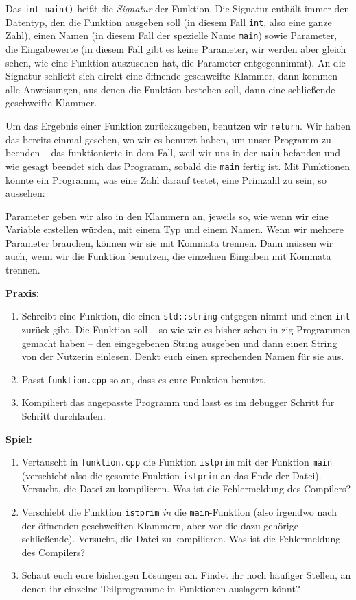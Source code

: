 Das \texttt{int main()} heißt die \emph{Signatur} der Funktion. Die Signatur
enthält immer den Datentyp, den die Funktion ausgeben soll (in diesem Fall
\texttt{int}, also eine ganze Zahl), einen Namen (in diesem Fall der spezielle
Name \texttt{main}) sowie Parameter, die Eingabewerte (in diesem Fall gibt es
keine Parameter, wir werden aber gleich sehen, wie eine Funktion auszusehen
hat, die Parameter entgegennimmt). An die Signatur schließt sich direkt eine
öffnende geschweifte Klammer, dann kommen alle Anweisungen, aus denen die
Funktion bestehen soll, dann eine schließende geschweifte Klammer.

Um das Ergebnis einer Funktion zurückzugeben, benutzen wir \texttt{return}. Wir
haben das bereits einmal gesehen, wo wir es benutzt haben, um unser Programm zu
beenden -- das funktionierte in dem Fall, weil wir uns in der \texttt{main}
befanden und wie gesagt beendet sich das Programm, sobald die \texttt{main}
fertig ist. Mit Funktionen könnte ein Programm, was eine Zahl darauf testet,
eine Primzahl zu sein, so aussehen:

Parameter geben wir also in den Klammern an, jeweils so, wie wenn wir eine
Variable erstellen würden, mit einem Typ und einem Namen. Wenn wir mehrere
Parameter brauchen, können wir sie mit Kommata trennen. Dann müssen wir auch,
wenn wir die Funktion benutzen, die einzelnen Eingaben mit Kommata trennen.

\textbf{Praxis:}
\begin{enumerate}
    \item Schreibt eine Funktion, die einen \texttt{std::string} entgegen nimmt
        und einen \texttt{int} zurück gibt. Die Funktion soll -- so wie wir es
        bisher schon in zig Programmen gemacht haben -- den eingegebenen String
        ausgeben und dann einen String von der Nutzerin einlesen. Denkt euch
        einen sprechenden Namen für sie aus.
    \item Passt \texttt{funktion.cpp} so an, dass es eure Funktion benutzt.
    \item Kompiliert das angepasste Programm und lasst es im debugger Schritt
        für Schritt durchlaufen.
\end{enumerate}

\textbf{Spiel:}
\begin{enumerate}
    \item Vertauscht in \texttt{funktion.cpp} die Funktion \texttt{istprim} mit
        der Funktion \texttt{main} (verschiebt also die gesamte Funktion
        \texttt{istprim} an das Ende der Datei). Versucht, die Datei zu
        kompilieren. Was ist die Fehlermeldung des Compilers?
    \item Verschiebt die Funktion \texttt{istprim} \emph{in} die
        \texttt{main}-Funktion (also irgendwo nach der öffnenden geschweiften
        Klammern, aber vor die dazu gehörige schließende). Versucht, die Datei
        zu kompilieren. Was ist die Fehlermeldung des Compilers?
    \item Schaut euch eure bisherigen Lösungen an. Findet ihr noch häufiger
        Stellen, an denen ihr einzelne Teilprogramme in Funktionen auslagern
        könnt?
\end{enumerate}
